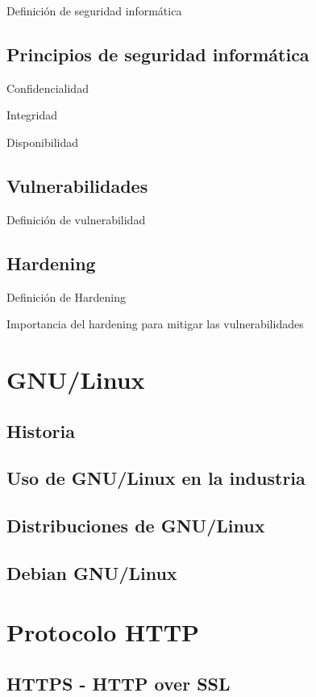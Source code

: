 Definici\'{o}n de seguridad inform\'{a}tica

      \subsection {Principios de seguridad inform\'{a}tica}

Confidencialidad

Integridad

Disponibilidad

      \subsection {Vulnerabilidades}

Definici\'{o}n de vulnerabilidad

      \subsection {Hardening}

Definici\'{o}n de Hardening

Importancia del hardening para mitigar las vulnerabilidades

    \section {GNU/Linux}
      \subsection {Historia}
      \subsection {Uso de GNU/Linux en la industria}
      \subsection {Distribuciones de GNU/Linux}
      \subsection {Debian GNU/Linux}
    \section {Protocolo HTTP}
      \subsection {HTTPS - HTTP over SSL}
